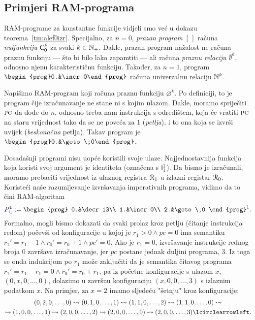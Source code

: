 \subsection{Primjeri RAM-programa}

RAM-programe za konstantne funkcije vidjeli smo već u dokazu teorema~\ref{tm:alef0izr}. Specijalno, za $n=0$, \emph{prazan program} $[\,]$ računa \emph{nulfunkciju} $\f{C}_0^k$ za svaki $k\in{\mathbb N}_+$. Dakle, prazan program nažalost ne računa praznu funkciju --- što bi bilo lako zapamtiti --- ali računa \emph{praznu relaciju} $\emptyset^k$, odnosno njenu karakterističnu funkciju. Također, za $n=1$, program $\begin{prog}0.&\incr0\end{prog}$ računa univerzalnu relaciju ${\mathbb N}^k$.

Napišimo RAM-program koji računa praznu funkciju $\varnothing^k$. Po definiciji, to je program čije izračunavanje ne stane ni s kojim ulazom. %
Dakle, moramo spriječiti $\textsc{pc}$ da dođe do $n$, odnosno treba nam instrukcija s odredištem, koja će vratiti $\textsc{pc}$ na staru vrijednost tako da se ne poveća za $1$ (\emph{petlja}), i to ona koja se izvrši uvijek (\emph{beskonačna} petlja). Takav program je $\begin{prog}0.&\goto\;0\end{prog}$.

Dosadašnji programi nisu uopće koristili svoje ulaze. Najjednostavnija funkcija koja koristi svoj argument je identiteta (označena s $\f I_1^1$). Da bismo je izračunali, moramo prebaciti vrijednost iz ulaznog registra $\mathcal R_{1}$ u izlazni registar $\mathcal R_{0}$. Koristeći naše razumijevanje izvršavanja imperativnih programa, vidimo da to čini RAM-algoritam
\begin{equation}\label{eq:RAMid}
    P_{\f I_1}^1:=\begin{prog}
        0.&\decr13\\
        1.&\incr0\\
        2.&\goto\;0
    \end{prog}^1\text.
\end{equation}
Formalno, mogli bismo dokazati da svaki prolaz kroz petlju (čitanje instrukcija redom) počevši od konfiguracije u kojoj je $r_1>0\land pc=0$ ima semantiku $r_1'=r_1-1\land r_0'=r_0+1\land pc'=0$. Ako je $r_1=0$, izvršavanje instrukcije rednog broja $0$ završava izračunavanje, jer $pc$ postane jednak duljini programa, $3$. Iz toga se onda indukcijom po $r_1$ može zaključiti da je semantika čitavog programa $r_1'=r_1-r_1=0\land r_0'=r_0+r_1$, pa iz početne konfiguracije s ulazom $x$, $(0,x,0,\dotsc,0)$, dolazimo u završnu konfiguraciju $(x,0,0,\dotsc,3)$ s izlaznim podatkom $x$. Na primjer, za $x=2$ imamo sljedeću "šetnju" kroz konfiguracije:
\begin{multline}
    (0,2,0,\dotsc,0)\leadsto
    (0,1,0,\dotsc,1)\leadsto
    (1,1,0,\dotsc,2)\leadsto
    (1,1,0,\dotsc,0)\leadsto\\
    \leadsto(1,0,0,\dotsc,1)\leadsto
    (2,0,0,\dotsc,2)\leadsto
    (2,0,0,\dotsc,0)\leadsto
    (2,0,0,\dotsc,3)\lcirclearrowleft\text.
\end{multline}

